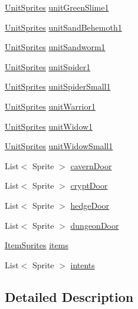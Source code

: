 \begin{DoxyCompactItemize}
\mbox{\hyperlink{class_unit_sprites}{Unit\+Sprites}} \mbox{\hyperlink{class_sprite_manager_a799b3283c6b93c9c395deba3390bcd87}{unit\+Green\+Slime1}}
\item 
\mbox{\hyperlink{class_unit_sprites}{Unit\+Sprites}} \mbox{\hyperlink{class_sprite_manager_af74d4c124738af254d099adae12a920c}{unit\+Sand\+Behemoth1}}
\item 
\mbox{\hyperlink{class_unit_sprites}{Unit\+Sprites}} \mbox{\hyperlink{class_sprite_manager_af6b6092b09e977440c9c301fcce90a9c}{unit\+Sandworm1}}
\item 
\mbox{\hyperlink{class_unit_sprites}{Unit\+Sprites}} \mbox{\hyperlink{class_sprite_manager_aabe45582c52f2f33409eddd3d74e95aa}{unit\+Spider1}}
\item 
\mbox{\hyperlink{class_unit_sprites}{Unit\+Sprites}} \mbox{\hyperlink{class_sprite_manager_abcfa64673eda733ff5a0791fca6774ef}{unit\+Spider\+Small1}}
\item 
\mbox{\hyperlink{class_unit_sprites}{Unit\+Sprites}} \mbox{\hyperlink{class_sprite_manager_a468d21273b76232a3c46e4806526191b}{unit\+Warrior1}}
\item 
\mbox{\hyperlink{class_unit_sprites}{Unit\+Sprites}} \mbox{\hyperlink{class_sprite_manager_a2de0703584ff32d531f6abeddd2ab249}{unit\+Widow1}}
\item 
\mbox{\hyperlink{class_unit_sprites}{Unit\+Sprites}} \mbox{\hyperlink{class_sprite_manager_af903c428c3cef263662f32fe5e183b6f}{unit\+Widow\+Small1}}
\item 
List$<$ Sprite $>$ \mbox{\hyperlink{class_sprite_manager_a0efbce48d098c815aa4706800aab65cc}{cavern\+Door}}
\item 
List$<$ Sprite $>$ \mbox{\hyperlink{class_sprite_manager_a534759a1cd37b734b35d39009c05433a}{crypt\+Door}}
\item 
List$<$ Sprite $>$ \mbox{\hyperlink{class_sprite_manager_ae9ce272224734b0bbeee411220ee61a9}{hedge\+Door}}
\item 
List$<$ Sprite $>$ \mbox{\hyperlink{class_sprite_manager_aa8fb324d0bd5bafec97e314f07322f52}{dungeon\+Door}}
\item 
\mbox{\hyperlink{class_item_sprites}{Item\+Sprites}} \mbox{\hyperlink{class_sprite_manager_a9ff4e140b84b106de6f88d7b97d61483}{items}}
\item 
List$<$ Sprite $>$ \mbox{\hyperlink{class_sprite_manager_aa89806bcec93d42c07a903b9739adf4f}{intents}}
\end{DoxyCompactItemize}


\subsection{Detailed Description}



